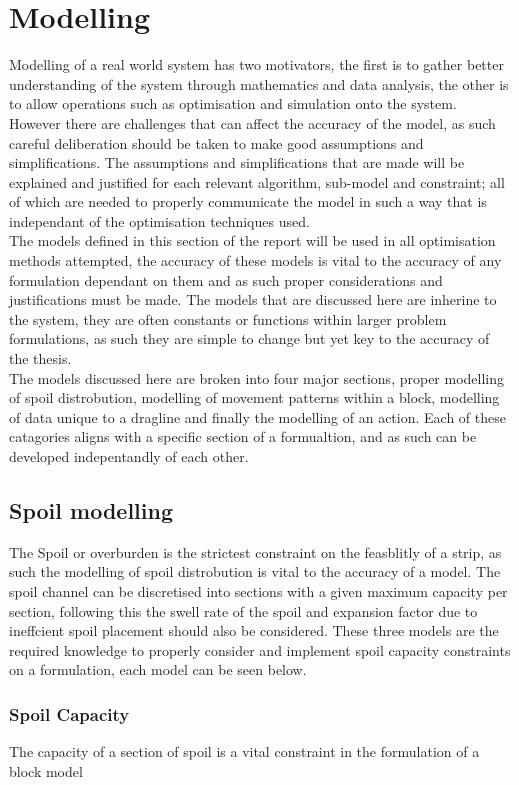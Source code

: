 
\section{Modelling}
Modelling of a real world system has two motivators, the first is to gather better understanding of the system through mathematics and data analysis, the other is to allow operations such as optimisation and simulation onto the system. However there are challenges that can affect the accuracy of the model, as such careful deliberation should be taken to make good assumptions and simplifications. The assumptions and simplifications that are made will be explained and justified for each relevant algorithm, sub-model and constraint; all of which are needed to properly communicate the model in such a way that is independant of the optimisation techniques used.  
\\
The models defined in this section of the report will be used in all optimisation methods attempted, the accuracy of these models is vital to the accuracy of any formulation dependant on them and as such proper considerations and justifications must be made. The models that are discussed here are inherine to the system, they are often constants or functions within larger problem formulations, as such they are simple to change but yet key to the accuracy of the thesis. \\
The models discussed here are broken into four major sections, proper modelling of spoil distrobution, modelling of movement patterns within a block, modelling of data unique to a dragline and finally the modelling of an action. Each of these catagories aligns with a specific section of a formualtion, and as such can be developed indepentandly of each other. 
\subsection{Spoil modelling}
The Spoil or overburden is the strictest constraint on the feasblitly of a strip, as such the modelling of spoil distrobution is vital to the accuracy of a model. The spoil channel can be discretised into sections with a given maximum capacity per section, following this the swell rate of the spoil and expansion factor due to ineffcient spoil placement should also be considered. These three models are the required knowledge to properly consider and implement spoil capacity constraints on a formulation, each model can be seen below. 
\subsubsection{Spoil Capacity}
The capacity of a section of spoil is a vital constraint in the formulation of a block model
